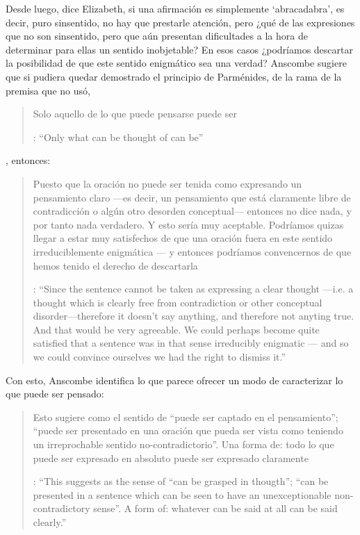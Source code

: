 Desde luego, dice Elizabeth, si una afirmación es simplemente `abracadabra', es decir, puro sinsentido, no hay que prestarle atención, pero ¿qué de las expresiones que no son sinsentido, pero que aún presentan dificultades a la hora de determinar para ellas un sentido inobjetable? En esos casos ¿podríamos descartar la posibilidad de que este sentido enigmático sea una verdad? Anscombe sugiere que si pudiera quedar demostrado el principio de Parménides, de la rama de la premisa que no usó, \blockquote[{\cite[6]{anscombe1981parmenides:pmc}}: \enquote{Only what can be thought of can be}]{Solo aquello de lo que puede pensarse puede ser}, entonces: \blockquote[{\cite[8]{anscombe1981parmenides:pmc}}: \enquote{Since the sentence cannot be taken as expressing a clear thought ---i.e. a thought which is clearly free from contradiction or other conceptual disorder---therefore it doesn't say anything, and therefore not anyting true. And that would be very agreeable. We could perhaps become quite satisfied that a sentence was in that sense irreducibly enigmatic --- and so we could convince ourselves we had the right to dismiss it.}]{Puesto que la oración no puede ser tenida como expresando un pensamiento claro ---es decir, un pensamiento que está claramente libre de contradicción o algún otro desorden conceptual--- entonces no dice nada, y por tanto nada verdadero. Y esto sería muy aceptable. Podríamos quizas llegar a estar muy satisfechos de que una oración fuera en este sentido irreduciblemente enigmática --- y entonces podríamos convencernos de que hemos tenido el derecho de descartarla}.

Con esto, Anscombe identifica lo que parece ofrecer un modo de caracterizar lo que puede ser pensado: \blockquote[{\cite[8]{anscombe1981parmenides:pmc}}: \enquote{This suggests as the sense of ``can be grasped in thougth''; ``can be presented in a sentence which can be seen to have an unexceptionable non-contradictory sense''. A form of: whatever can be said at all can be said clearly.}]{Esto sugiere como el sentido de ``puede ser captado en el pensamiento''; ``puede ser presentado en una oración que pueda ser vista como teniendo un irreprochable sentido no-contradictorio''. Una forma de: todo lo que puede ser expresado en absoluto puede ser expresado claramente}.

